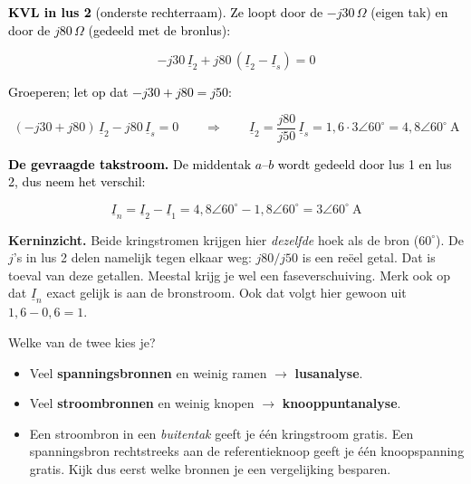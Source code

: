 \documentclass[a4paper,11pt]{article}
\newcommand{\stapreden}[1]{\par\vspace{1.4mm}\noindent\textcolor{black}{#1}\par\vspace{-2mm}}
\begin{document}
\begin{oefening}
    \stapreden{\textbf{KVL in lus 2} (onderste rechterraam). Ze loopt door de $-j30\,\Omega$ (eigen tak) en door de $j80\,\Omega$ (gedeeld met de bronlus):}
    \[-j30\,\underline{I}_2 + j80\,(\underline{I}_2 - \underline{I}_s) = 0\]

    \stapreden{Groeperen; let op dat $-j30 + j80 = j50$:}
    \[(-j30 + j80)\,\underline{I}_2 - j80\,\underline{I}_s = 0
        \qquad\Longrightarrow\qquad
        \underline{I}_2 = \frac{j80}{j50}\,\underline{I}_s = 1{,}6 \cdot 3\angle 60^\circ
        = \boxed{4{,}8\angle 60^\circ\ \text{A}}\]

    \stapreden{\textbf{De gevraagde takstroom.} De middentak $a$--$b$ wordt gedeeld door lus 1 en lus 2, dus neem het verschil:}
    \[\underline{I}_n = \underline{I}_2 - \underline{I}_1 = 4{,}8\angle 60^\circ - 1{,}8\angle 60^\circ
        = \boxed{3\angle 60^\circ\ \text{A}}\]

    \textbf{Kerninzicht.} Beide kringstromen krijgen hier \emph{dezelfde} hoek als de bron
    ($60^\circ$). De $j$'s in lus 2 delen namelijk tegen elkaar weg: $j80/j50$ is een re\"eel getal.
    Dat is toeval van deze getallen. Meestal krijg je wel een faseverschuiving.
    Merk ook op dat $\underline{I}_n$ exact gelijk is aan de bronstroom. Ook dat volgt hier
    gewoon uit $1{,}6 - 0{,}6 = 1$.
\end{oefening}

Welke van de twee kies je?
\begin{itemize}
    \item Veel \textbf{spanningsbronnen} en weinig ramen $\rightarrow$ \textbf{lusanalyse}.
    \item Veel \textbf{stroombronnen} en weinig knopen $\rightarrow$ \textbf{knooppuntanalyse}.
    \item Een stroombron in een \emph{buitentak} geeft je \'e\'en kringstroom gratis. Een
          spanningsbron rechtstreeks aan de referentieknoop geeft je \'e\'en knoopspanning gratis.
          Kijk dus eerst welke bronnen je een vergelijking besparen.
\end{itemize}
\end{document}
